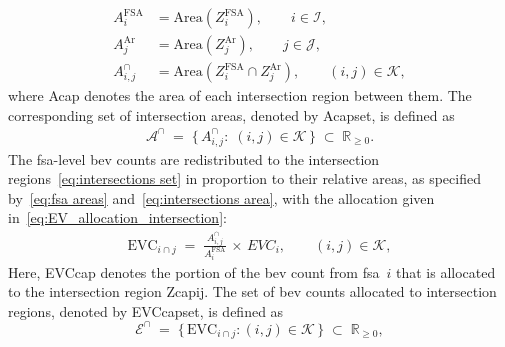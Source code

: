 \begin{align}
  A^{\mathrm{FSA}}_i &= \mathrm{Area}\!\left(Z^{\mathrm{FSA}}_i\right), \qquad i \in \mathcal{I}, \label{eq:fsa areas} \\
  A^{\mathrm{Ar}}_j  &= \mathrm{Area}\!\left(Z^{\mathrm{Ar}}_j\right), \qquad j \in \mathcal{J}, \label{eq:artertal_zones_area} \\
  A^{\cap}_{i,j}     &= \mathrm{Area}\!\left(Z^{\mathrm{FSA}}_i \cap Z^{\mathrm{Ar}}_j\right), 
  \qquad (i,j) \in \mathcal{K}, \label{eq:intersections area}
\end{align}
where \gls{Acap} denotes the area of each intersection region between them.
The corresponding set of intersection areas, denoted by \gls{Acapset}, is defined as 
\begin{align}
  \mathcal{A}^{\cap}
  \;=\; \bigl\{\, A^{\cap}_{i,j} 
  :\; (i,j)\in\mathcal{K} \,\bigr\}
  \;\subset\; \mathbb{R}_{\ge 0}.
\end{align}
The \gls{fsa}-level \gls{bev} counts are redistributed to the intersection regions~\eqref{eq:intersections set} in proportion to their relative areas, as specified by~\eqref{eq:fsa areas} and~\eqref{eq:intersections area}, with the allocation given in~\eqref{eq:EV_allocation_intersection}:
\begin{align}  \label{eq:EV_allocation_intersection}
    \mathrm{EVC}_{i \cap j} \;=\;
    \frac{A^{\cap}_{i,j}}{A^{\mathrm{FSA}}_i} \,\times\, EVC_i,
    \qquad (i,j) \in \mathcal{K},
\end{align}
Here, \gls{EVCcap} denotes the portion of the \gls{bev} count from \gls{fsa}~$i$ that is allocated to the intersection region \gls{Zcapij}.
The set of \gls{bev} counts allocated to intersection regions, denoted by \gls{EVCcapset}, is defined as
\begin{equation} 
\label{eq:ev_counts_for_intersection}
  \mathcal{E}^{\cap}
  \;=\; \bigl\{\, \mathrm{EVC}_{i \cap j} 
  : (i,j)\in\mathcal{K} \,\bigr\}
  \;\subset\; \mathbb{R}_{\ge 0},
\end{equation}
